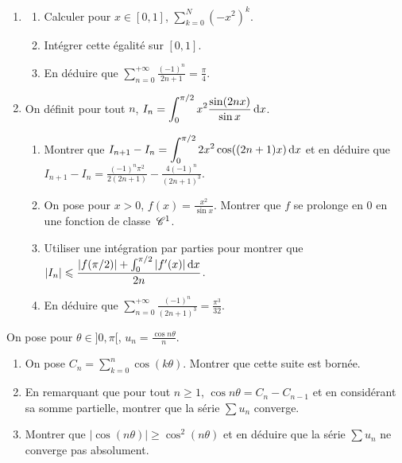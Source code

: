 \begin{exercice}
\begin{enumerate}
    \item
    \begin{enumerate}
        \item Calculer pour $x\in[0,1]$, $\displaystyle\sum_{k=0}^{N}\left(-x^{2}\right)^{k}$.
        \item Intégrer cette égalité sur $[0, 1]$.
        \item En déduire que $\displaystyle\sum_{n=0}^{+\infty}\frac{(-1)^{n}}{2n+1}=\frac{\pi}{4}$.

    \end{enumerate}
    
    \item On définit pour tout $n$, $\displaystyle I_{n}=\int_{0}^{\pi/2}x^{2}\frac{\sin(2nx)}{\sin x} \,\mathrm{d}x$.
    \begin{enumerate}
        \item Montrer que $\displaystyle I_{n+1}-I_{n}=\int_{0}^{\pi/2}2x^{2}\cos((2n+1)x) \,\mathrm{d}x$ 
        et en déduire que $I_{n+1}-I_{n}=\frac{(-1)^{n}\pi^{2}}{2(2n+1)}-\frac{4(-1)^{n}}{(2n+1)^{3}}$.
        \item On pose pour $x>0$, $f(x)=\frac{x^{2}}{\sin x}$. Montrer que $f$ se prolonge en 0 en une fonction de classe $\,\mathscr C^{1}$.
        \item Utiliser une intégration par parties pour montrer que $\displaystyle|I_{n}|\leqslant\frac{|f(\pi/2)|+\int_{0}^{\pi/2}|f^{\prime}(x)| \,\mathrm{d}x}{2n}$.
        \item En déduire que $\displaystyle\sum_{n=0}^{+\infty}\frac{(-1)^{n}}{(2n+1)^{3}}=\frac{\pi^{3}}{32}$. %
    \end{enumerate}
\end{enumerate}
\end{exercice}

\begin{exercice}
    On pose pour $\theta\in]0,\pi[$, $u_{n}=\frac{\cos n\theta}{n}$.
    \begin{enumerate}
        \item On pose $\displaystyle C_{n}=\sum_{k=0}^{n}\cos(k\theta)$. Montrer que cette suite est bornée.
        \item En remarquant que pour tout $n\geqslant1$, $\cos n\theta=C_{n}-C_{n-1}$ et en considérant sa somme partielle, 
            montrer que la série $\sum u_{n}$ converge.
        \item Montrer que $|\cos(n\theta)|\geqslant \cos^{2}(n\theta)$ et en déduire que la série $\sum u_{n}$ ne converge pas absolument.
    \end{enumerate}
\end{exercice}

